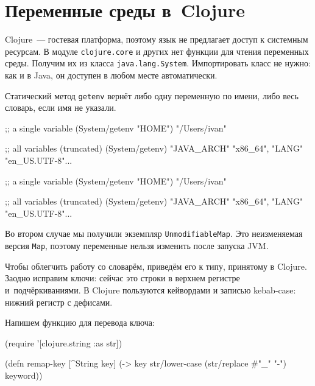 \section{Переменные среды в~Clojure}


Clojure~--- гостевая платформа, поэтому язык не предлагает доступ к системным
ресурсам. В модуле \verb|clojure.core| и других нет функции для чтения
переменных среды. Получим их из класса \verb|java.lang.System|. Импортировать
класс не нужно: как и в Java, он доступен в любом месте автоматически.

Статический метод \verb|getenv| вернёт либо одну переменную по имени, либо
весь словарь, если имя не указали.

\ifnarrow

\begin{english}
  \begin{clojure}
;; a single variable
(System/getenv "HOME")
"/Users/ivan"

;; all variables (truncated)
(System/getenv)
{"JAVA_ARCH" "x86_64",
 "LANG" "en_US.UTF-8"...}
  \end{clojure}
\end{english}

\else

\begin{english}
  \begin{clojure}
;; a single variable
(System/getenv "HOME")
"/Users/ivan"

;; all variables (truncated)
(System/getenv)
{"JAVA_ARCH" "x86_64", "LANG" "en_US.UTF-8"...}
  \end{clojure}
\end{english}

\fi

Во втором случае мы получили экземпляр \texttt{UnmodifiableMap}. Это
неизменяемая версия \verb|Map|, поэтому переменные нельзя изменить после запуска
JVM.

Чтобы облегчить работу со словарём, приведём его к типу, принятому в
Clojure. Заодно исправим ключи: сейчас это строки в верхнем регистре
и~подчёркиваниями. В Clojure пользуются кейвордами и записью kebab-case: нижний
регистр с дефисами.

Напишем функцию для перевода ключа:

\begin{english}
  \begin{clojure}
(require '[clojure.string :as str])

(defn remap-key [^String key]
  (-> key
      str/lower-case
      (str/replace #"_" "-")
      keyword))
  \end{clojure}
\end{english}

